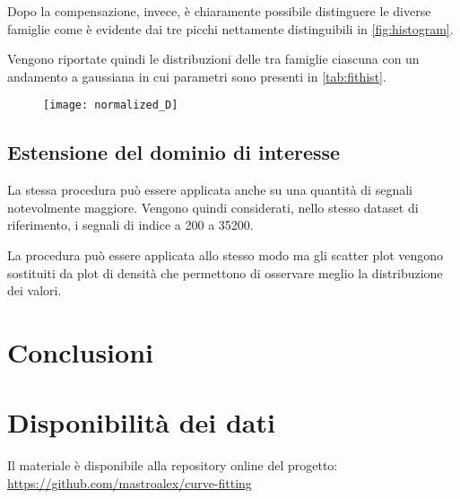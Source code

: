 Dopo la compensazione, invece, è chiaramente possibile distinguere le diverse famiglie come è evidente dai tre picchi nettamente distinguibili in \cref{fig:histogram}.

Vengono riportate quindi le distribuzioni delle tra famiglie ciascuna con un andamento a gaussiana in cui parametri sono presenti in \cref{tab:fithist}.




\begin{figure}[b!]
	\centering
	\texttt{[image: normalized\_D]}
	\caption{}
	\label{fig:normalizedDensity}
\end{figure}





\subsection{Estensione del dominio di interesse}




La stessa procedura può essere applicata anche su una quantità di segnali notevolmente maggiore. Vengono quindi considerati, nello stesso dataset di riferimento, i segnali di indice a 200 a 35200. 

La procedura può essere applicata allo stesso modo ma gli scatter plot vengono sostituiti da plot di densità che permettono di osservare meglio la distribuzione dei valori.


\section{Conclusioni}
\textcolor{blue}{\lipsum[1]}

\pagebreak
\section*{Disponibilità dei dati}

Il materiale è disponibile alla repository online del progetto: \url{https://github.com/mastroalex/curve-fitting}


\raggedbottom
\printbibliography[title=Riferimenti]






